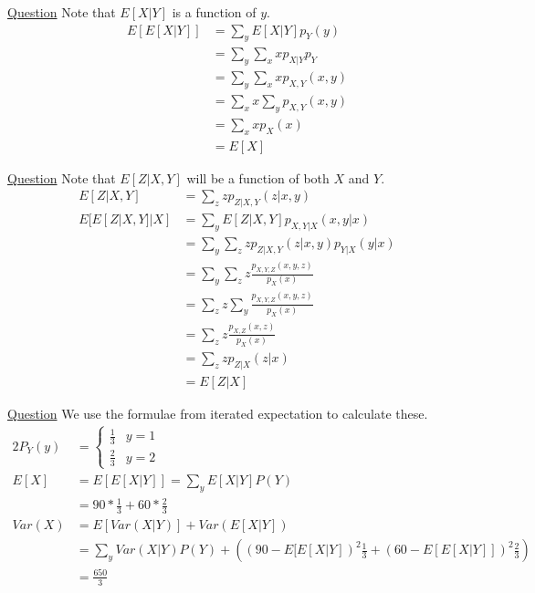 \documentclass[../probability-notes.tex]{subfiles}
\begin{document}
\begin{enumerate}
        \hypertarget{a_itrexpproof}{\item} \hyperlink{q_itrexpproof}{Question} \newline
        Note that $E[X|Y]$ is a function of $y$.
        \begin{align*}
            E[E[X|Y]] &= \sum_{y} E[X|Y] p_Y(y)\\
                     &= \sum_{y} \sum_{x} xp_{X|Y}p_{Y}\\
                     &= \sum_{y}\sum_{x} xp_{X,Y}(x,y)\\
                     &= \sum_{x}x\sum_{y}p_{X,Y}(x,y)\\
                     &= \sum_{x} x p_{X}(x)\\
                     &= E[X]
        \end{align*}


        \hypertarget{a_itrexpthree}{\item} \hyperlink{q_itrexpthree}{Question} \newline
        Note that $E[Z|X,Y]$ will be a function of both $X$ and $Y$.
        \begin{align*}
            E[Z|X,Y] &= \sum_{z} z p_{Z|X,Y}(z|x,y)\\
            E[E[Z|X,Y]|X] &= \sum_{y} E[Z|X,Y]p_{X,Y|X}(x,y|x)\\
                        &= \sum_{y} \sum_{z} z p_{Z|X,Y}(z|x,y) p_{Y|X}(y|x)\\
                        &= \sum_{y} \sum_{z} z \frac{p_{X,Y,Z}(x,y,z)}{p_{X}(x)}\\
                        &= \sum_{z} z \sum_{y} \frac{p_{X,Y,Z}(x,y,z)}{p_{X}(x)}\\
                        &= \sum_{z} z \frac{p_{X,Z}(x,z)}{p_{X}(x)}\\
                        &= \sum_{z} z p_{Z|X}(z|x)\\
                        &= E[Z|X]
        \end{align*}

    
        \hypertarget{a_itrexppractice}{\item} \hyperlink{q_itrexppractice}{Question}\newline
        We use the formulae from iterated expectation to calculate these.
        \begin{alignat*}{2}
            P_{Y}(y) &= \begin{cases} \frac{1}{3} &y = 1\\
                                    \frac{2}{3} &y = 2 \end{cases}\\
            E[X] &= E[E[X|Y]] = \sum_{y}E[X|Y]P(Y)\\
                &= 90 * \frac{1}{3} + 60 * \frac{2}{3}\\
            Var(X) &= E[Var(X|Y)] + Var(E[X|Y])\\
                  &= \sum_{y}Var(X|Y)P(Y) + ((90-E[E[X|Y])^{2}\frac{1}{3} + (60-E[E[X|Y]])^{2}\frac{2}{3})\\
                  &= \frac{650}{3}
        \end{alignat*}
        

\end{enumerate}
\end{document}
